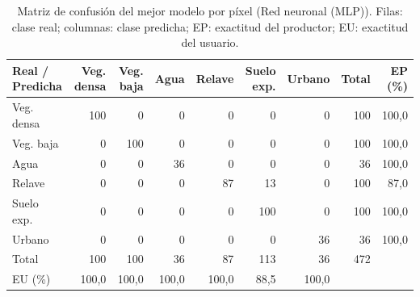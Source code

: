 \begin{table}[htbp]
 \centering
 \small
\setlength{\tabcolsep}{3.5pt}
 \caption{Matriz de confusión del mejor modelo por píxel (Red neuronal (MLP)). Filas: clase real; columnas: clase predicha; EP: exactitud del productor; EU: exactitud del usuario.}
 \label{tab:matriz_mejor}
 \begin{tabular}{lrrrrrrrr}
  \toprule
  Real / Predicha & Veg. densa & Veg. baja & Agua & Relave & Suelo exp. & Urbano & Total & EP (\%) \\
  \midrule
  Veg. densa & 100 & 0 & 0 & 0 & 0 & 0 & 100 & 100{,}0 \\
  Veg. baja & 0 & 100 & 0 & 0 & 0 & 0 & 100 & 100{,}0 \\
  Agua & 0 & 0 & 36 & 0 & 0 & 0 & 36 & 100{,}0 \\
  Relave & 0 & 0 & 0 & 87 & 13 & 0 & 100 & 87{,}0 \\
  Suelo exp. & 0 & 0 & 0 & 0 & 100 & 0 & 100 & 100{,}0 \\
  Urbano & 0 & 0 & 0 & 0 & 0 & 36 & 36 & 100{,}0 \\
  \midrule
  Total & 100 & 100 & 36 & 87 & 113 & 36 & 472 & \\
  EU (\%) & 100{,}0 & 100{,}0 & 100{,}0 & 100{,}0 & 88{,}5 & 100{,}0 & & \\
  \bottomrule
 \end{tabular}
\end{table}
